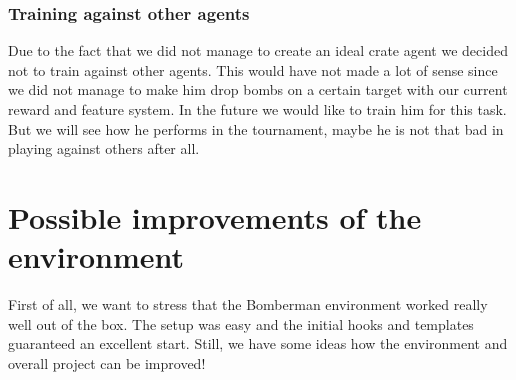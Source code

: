 \subsubsection*{Training against other agents}
Due to the fact that we did not manage to create an ideal crate agent we decided not to train against other agents. This would have not made a lot of sense since we did not manage to make him drop bombs on a certain target with our current reward and feature system. In the future we would like to train him for this task. But we will see how he performs in the tournament, maybe he is not that bad in playing against others after all.

\section{Possible improvements of the environment}

First of all, we want to stress that the Bomberman environment worked really well out of the box. The setup was easy and the initial hooks and templates guaranteed an excellent start. Still, we have some ideas how the environment and overall project can be improved!

